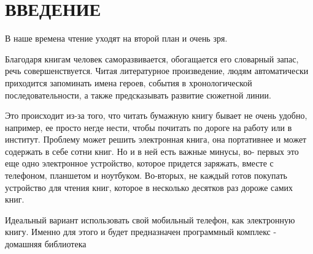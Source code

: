\chapter*{ВВЕДЕНИЕ}

В наше времена чтение уходят на второй план и очень зря.\par
Благодаря книгам человек саморазвивается, обогащается его словарный
запас, речь совершенствуется. Читая литературное произведение, людям
автоматически приходится запоминать имена героев, события в
хронологической последовательности, а также предсказывать развитие
сюжетной линии.\par
Это происходит из-за того, что читать бумажную книгу бывает не очень
удобно, например, ее просто негде нести, чтобы почитать по дороге на работу
или в институт. Проблему может решить электронная книга, она портативнее
и может содержать в себе сотни книг. Но и в ней есть важные минусы, во-
первых это еще одно электронное устройство, которое придется заряжать,
вместе с телефоном, планшетом и ноутбуком. Во-вторых, не каждый готов
покупать устройство для чтения книг, которое в несколько десятков раз
дороже самих книг.\par
Идеальный вариант использовать свой мобильный телефон, как
электронную книгу. Именно для этого и будет предназначен программный
комплекс - домашняя библиотека

